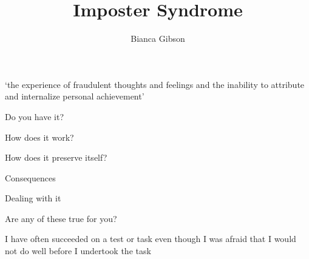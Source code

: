 \documentclass[aspectratio=169]{beamer}
\title{Imposter Syndrome}
\author{Bianca Gibson}
\institute{Pycon AU 2016}
\date{}
\begin{document}
\frame{\titlepage}

\begin{frame}
  \begin{center}
    \Huge `the experience of fraudulent thoughts and feelings and the inability to attribute and internalize personal achievement'
    \\ \small \cite{hh15}
  \end{center}
\end{frame}

\begin{frame}
  \begin{center}
    \Huge Do you have it?
  \end{center}
\end{frame}

\begin{frame}
  \begin{center}
    \Huge How does it work?
  \end{center}
\end{frame}

\begin{frame}
  \begin{center}
    \Huge How does it preserve itself?
  \end{center}
\end{frame}

\begin{frame}
  \begin{center}
    \Huge Consequences
  \end{center}
\end{frame}

\begin{frame}
  \begin{center}
    \Huge Dealing with it
  \end{center}
\end{frame}

\begin{frame}
  \begin{center}
    \Huge Are any of these true for you?
    \\ \small \cite{clance85}
  \end{center}
\end{frame}

\begin{frame}
  \begin{center}
    \Huge  I have often succeeded on a test or task even though I was afraid that I would not do well before I undertook the task
  \end{center}
\end{frame}
\end{document}
